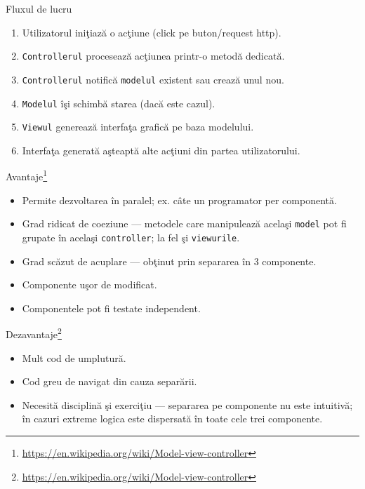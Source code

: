 \documentclass[presentation]{beamer}
\begin{document}
\begin{frame}[label={sec:org5b344bd},fragile]{Fluxul de lucru}
 \begin{enumerate}
\item Utilizatorul iniţiază o acţiune (click pe buton/request http).
\item \texttt{Controllerul} procesează acţiunea printr-o metodă dedicată.
\item \texttt{Controllerul} notifică \texttt{modelul} existent sau crează unul nou.
\item \texttt{Modelul} îşi schimbă starea (dacă este cazul).
\item \texttt{Viewul} generează interfaţa grafică pe baza modelului.
\item Interfaţa generată aşteaptă alte acţiuni din partea utilizatorului.
\end{enumerate}
\end{frame}
\begin{frame}[label={sec:org3ae345e},fragile]{Avantaje\footnote{\url{https://en.wikipedia.org/wiki/Model-view-controller}}}
 \begin{itemize}
\item Permite dezvoltarea în paralel; ex. câte un programator per componentă.
\item Grad ridicat de coeziune --- metodele care manipulează acelaşi \texttt{model} pot fi grupate în acelaşi \texttt{controller}; la fel şi \texttt{viewurile}.
\item Grad scăzut de acuplare --- obţinut prin separarea în 3 componente.
\item Componente uşor de modificat.
\item Componentele pot fi testate independent.
\end{itemize}
\end{frame}
\begin{frame}[label={sec:org8fbe4df}]{Dezavantaje\footnote{\url{https://en.wikipedia.org/wiki/Model-view-controller}}}
\begin{itemize}
\item Mult cod de umplutură.
\item Cod greu de navigat din cauza separării.
\item Necesită disciplină şi exerciţiu --- separarea pe componente nu este intuitivă; în cazuri extreme logica este dispersată în toate cele trei componente.
\end{itemize}
\end{frame}
\end{document}
